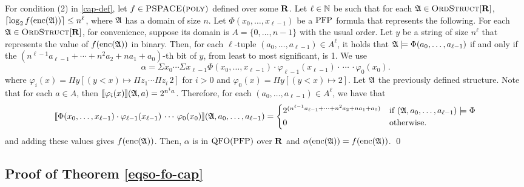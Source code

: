 For condition (2) in \ref{cap-def}, let $f\in \text{\sc PSPACE(poly)}$ defined over some $\mathbf{R}$. Let $\ell\in\mathbb{N}$ be such that for each $\mathfrak{A}\in\text{\sc OrdStruct}[\mathbf{R}]$, $\lceil\log_2 f({\rm enc}(\mathfrak{A})) \rceil \leq n^\ell$, where $\mathfrak{A}$ has a domain of size $n$. Let $\Phi(x_0,\ldots,x_{\ell-1})$ be a ${\rm PFP}$ formula that represents the following. For each $\mathfrak{A} \in \text{\sc OrdStruct}[\mathbf{R}]$, for convenience, suppose its domain is $A = \{0,\ldots,n-1\}$ with the usual order. Let $y$ be a string of size $n^{\ell}$ that represents the value of $f({\rm enc}(\mathfrak{A}))$ in binary. Then, for each $\ell$-tuple $(a_0,\ldots,a_{\ell-1}) \in A^{\ell}$, it holds that $\mathfrak{A} \models \Phi(a_0,\ldots,a_{\ell-1})$ if and only if the $(n^{\ell-1}a_{\ell-1} + \cdots + n^2 a_2 + n a_1 + a_0)$-th bit of $y$, from least to most significant, is 1. We use
$$
\alpha = \Sigma x_0 \cdots \Sigma x_{\ell-1} \Phi(x_0,\ldots,x_{\ell-1})\cdot\varphi_{\ell-1}(x_{\ell-1})\cdot\,\cdots\,\cdot\varphi_0(x_0).
$$
where $\varphi_i(x) = \Pi y[(y < x)\mapsto\Pi z_1\cdots\Pi z_i\,2]$ for $i > 0$ and $\varphi_0(x) = \Pi y[(y < x)\mapsto 2]$. Let $\mathfrak{A}$ the previously defined structure. Note that for each $a\in A$, then ${\llbracket{}{\varphi_i(x)}\rrbracket}(\mathfrak{A},a) = 2^{n^i a}$. Therefore, for each $(a_0,\ldots,a_{\ell-1})\in A^\ell$, we have that
$$
{\llbracket{}{\Phi(x_0,\ldots,x_{\ell-1})\cdot\varphi_{\ell-1}(x_{\ell-1})\,\cdots\,\varphi_0(x_0)}\rrbracket}(\mathfrak{A},a_0,\ldots,a_{\ell-1}) = 
\begin{cases}
2^{(n^{\ell-1}a_{\ell-1} + \cdots + n^2 a_2 + n a_1 + a_0)} &\text{if } (\mathfrak{A},a_0,\ldots,a_{\ell-1})\models\Phi \\
0 &\text{otherwise.}
\end{cases}
$$
and adding these values gives $f({\rm enc}(\mathfrak{A}))$. Then, $\alpha$ is in ${\rm QFO}({\rm PFP})$ over $\mathbf{R}$ and $\alpha({\rm enc}(\mathfrak{A})) = f({\rm enc}(\mathfrak{A}))$. \qed

\subsection{Proof of Theorem \ref{eqso-fo-cap}}

